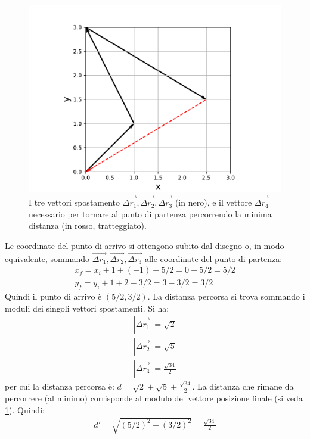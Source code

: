 \documentclass[12pt,a4paper]{book}
\begin{document}
 \begin{figure}[!ht]
\centering
\includegraphics[scale=0.6]{vettori2.pdf}
\caption{I tre vettori spostamento $\vec{\Delta r_1}, \vec{\Delta r_2}, \vec{\Delta r_3}$ (in nero), e il vettore $\vec{\Delta r_4}$ necessario per tornare al punto di partenza percorrendo la minima distanza (in rosso, tratteggiato).  }
\label{fig:vettori2}
\end{figure}

Le coordinate del punto di arrivo si ottengono subito dal disegno o, in modo equivalente, sommando $\vec{\Delta r_1}, \vec{\Delta r_2}, \vec{\Delta r_3}$ alle coordinate del punto di partenza:
\begin{gather*}
x_f=x_i +1 + (-1) +5/2= 0 + 5/2=5/2\\
y_f=y_i +1 + 2 - 3/2= 3 - 3/2=3/2
\end{gather*}
Quindi il punto di arrivo è $(5/2, 3/2)$. La distanza percorsa si trova sommando i moduli dei singoli vettori spostamenti. Si ha:
\begin{gather*}
|\vec{\Delta r_1}|=\sqrt{2} \\
|\vec{\Delta r_2}|=\sqrt{5} \\
|\vec{\Delta r_3}|=\frac{\sqrt{34}}{2}
\end{gather*}
per cui la distanza percorsa è: $d=\sqrt{2}+\sqrt{5}+\frac{\sqrt{34}}{2}$. La distanza che rimane da percorrere (al minimo) corrisponde al modulo 
del vettore posizione finale (si veda \ref{fig:vettori2}). Quindi:
\begin{gather*}
d'=\sqrt{(5/2)^2+(3/2)^2}=\frac{\sqrt{34}}{2}
\end{gather*}
\end{document}
